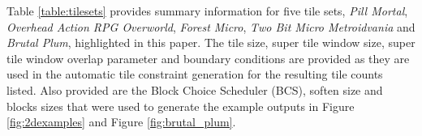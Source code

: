 

Table \ref{table:tilesets} provides summary information for five tile sets, \textit{Pill Mortal}, \textit{Overhead Action RPG Overworld},
\textit{Forest Micro}, \textit{Two Bit Micro Metroidvania} and \textit{Brutal Plum}, highlighted in this paper.
The tile size, super tile window size, super tile window overlap parameter and boundary conditions are provided as they are used in the automatic tile constraint generation
for the resulting tile counts listed.
Also provided are the Block Choice Scheduler (BCS), soften size and blocks sizes that were used to generate the example outputs in Figure \ref{fig:2dexamples} and Figure \ref{fig:brutal_plum}.


